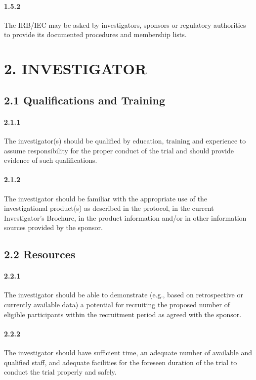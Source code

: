 \documentclass[11pt]{article}
\begin{document}
\paragraph{1.5.2} The IRB/IEC may be asked by investigators, sponsors or regulatory authorities to provide its documented procedures and membership lists.

\section{2. INVESTIGATOR}

\subsection{2.1 Qualifications and Training}

\paragraph{2.1.1} The investigator(s) should be qualified by education, training and experience to assume responsibility for the proper conduct of the trial and should provide evidence of such qualifications.

\paragraph{2.1.2} The investigator should be familiar with the appropriate use of the investigational product(s) as described in the protocol, in the current Investigator's Brochure, in the product information and/or in other information sources provided by the sponsor.

\subsection{2.2 Resources}

\paragraph{2.2.1} The investigator should be able to demonstrate (e.g., based on retrospective or currently available data) a potential for recruiting the proposed number of eligible participants within the recruitment period as agreed with the sponsor.

\paragraph{2.2.2} The investigator should have sufficient time, an adequate number of available and qualified staff, and adequate facilities for the foreseen duration of the trial to conduct the trial properly and safely.
\end{document}
